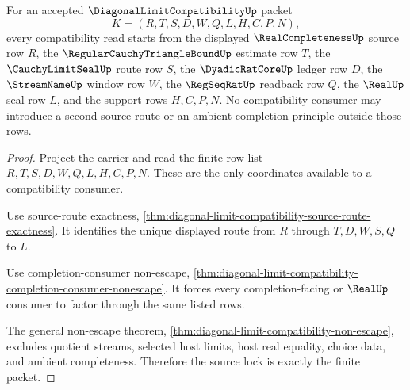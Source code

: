 \begin{theorem}
\label{thm:diagonal-limit-compatibility-finite-source-lock}
For an accepted $\DiagonalLimitCompatibilityUp$ packet
$$
K=(R,T,S,D,W,Q,L,H,C,P,N),
$$
every compatibility read starts from the displayed $\RealCompletenessUp$ source row $R$, the $\RegularCauchyTriangleBoundUp$ estimate row $T$, the $\CauchyLimitSealUp$ route row $S$, the $\DyadicRatCoreUp$ ledger row $D$, the $\StreamNameUp$ window row $W$, the $\RegSeqRatUp$ readback row $Q$, the $\RealUp$ seal row $L$, and the support rows $H,C,P,N$. No compatibility consumer may introduce a second source route or an ambient completion principle outside those rows.
\end{theorem}
\begin{proof}
Project the carrier and read the finite row list $R,T,S,D,W,Q,L,H,C,P,N$. These are the only coordinates available to a compatibility consumer.

Use source-route exactness, \autoref{thm:diagonal-limit-compatibility-source-route-exactness}. It identifies the unique displayed route from $R$ through $T,D,W,S,Q$ to $L$.

Use completion-consumer non-escape, \autoref{thm:diagonal-limit-compatibility-completion-consumer-nonescape}. It forces every completion-facing or $\RealUp$ consumer to factor through the same listed rows.

The general non-escape theorem, \autoref{thm:diagonal-limit-compatibility-non-escape}, excludes quotient streams, selected host limits, host real equality, choice data, and ambient completeness. Therefore the source lock is exactly the finite packet.
\end{proof}

